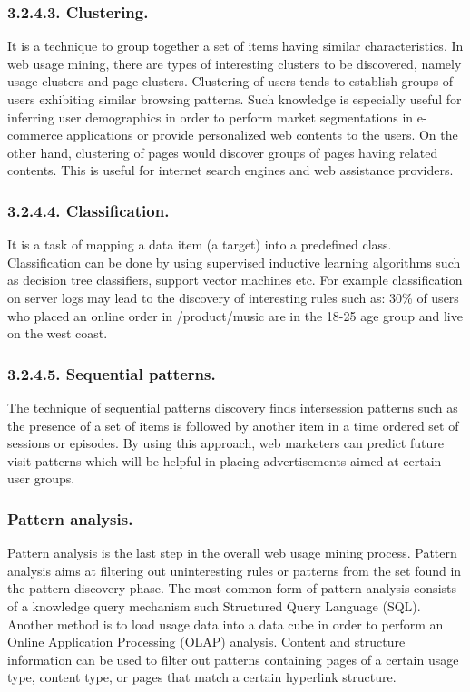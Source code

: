 \documentclass{article}
\begin{document}
\subsubsection*{3.2.4.3. Clustering.}
It is a technique to group together a set of items having similar characteristics. In web usage mining, there are types of interesting clusters to be discovered, namely usage clusters and page clusters. Clustering of users tends to establish groups of users exhibiting similar browsing patterns. Such knowledge is especially useful for inferring user demographics in order to perform market segmentations in e-commerce applications or provide personalized web contents to the users. On the other hand, clustering of pages would discover groups of pages having related contents. This is useful for internet search engines and web assistance providers.
\subsubsection*{3.2.4.4. Classification.} 
It is a task of mapping a data item (a target) into a  predefined class. Classification can be done by using supervised inductive learning algorithms such as decision tree classifiers, support vector machines etc. For example classification on server logs may lead to the discovery of interesting rules such as: 30\% of users who placed an online order in /product/music are in the 18-25 age group and live on the west coast.
\subsubsection*{3.2.4.5. Sequential patterns.}
 The technique of sequential patterns discovery finds intersession patterns such as the presence of a set of items is followed by another item in a time ordered set of sessions or episodes. By using this approach, web marketers can predict future visit patterns which will be helpful in placing advertisements aimed at certain user groups.

\subsubsection{ Pattern analysis.}
Pattern analysis is the last step in the overall web usage mining process. Pattern analysis aims at filtering out uninteresting rules or patterns from the set found in the pattern discovery phase. The most common form of pattern analysis consists of a knowledge query mechanism such Structured Query Language (SQL). Another method is to load usage data into a data cube in order to perform an Online Application Processing (OLAP) analysis. Content and structure information can be used to filter out patterns containing pages of a certain usage type, content type, or pages that match a certain hyperlink structure.
\end{document}
